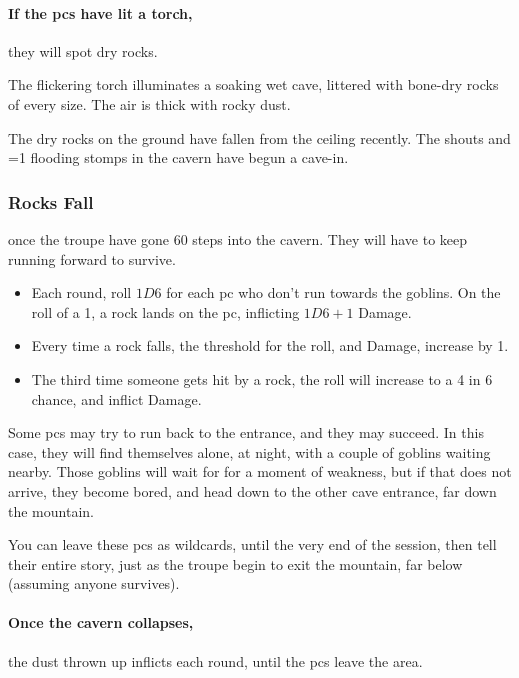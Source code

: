 \begin{multicols}{2}
\paragraph{If the \glspl{pc} have lit a torch,}
they will spot dry rocks.

\begin{boxtext}
  The flickering torch illuminates a soaking wet cave, littered with bone-dry rocks of every size.
  The air is thick with rocky dust.
\end{boxtext}

The dry rocks on the ground have fallen from the ceiling recently.
The shouts and \ifnum\value{temperature}=1 flooding \else stomps \fi in the cavern have begun a cave-in.

\subsubsection{Rocks Fall}
once the troupe have gone 60 steps into the cavern.
They will have to keep running forward to survive.

\begin{itemize}
  \item
  Each round, roll $1D6$ for each \gls{pc} who don't run towards the goblins.
  On the roll of a 1, a rock lands on the \gls{pc}, inflicting $1D6+1$ Damage.
  \item
  Every time a rock falls, the threshold for the roll, and Damage, increase by 1.
  \item
    The third time someone gets hit by a rock, the roll will increase to a 4 in 6 chance, and inflict  Damage.
\end{itemize}

\caveIn

Some \glspl{pc} may try to run back to the entrance, and they may succeed.
In this case, they will find themselves alone, at night, with a couple of goblins waiting nearby.
Those goblins will wait for  for a moment of weakness, but if that does not arrive, they become bored, and head down to the other cave entrance, far down the mountain.

You can leave these \glspl{pc} as wildcards, until the very end of the session, then tell their entire story, just as the troupe begin to exit the mountain, far below (assuming anyone survives).


\paragraph{Once the cavern collapses,}
the dust thrown up inflicts  each \gls{round}, until the \glspl{pc} leave the \gls{area}.


\end{multicols}
